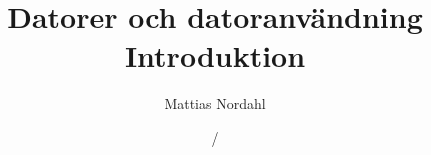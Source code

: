 \documentclass[handout]{beamer}
\author[]{Mattias Nordahl}
\institute{\url{mattias.nordahl@cs.lth.se}}
\date{}
\begin{document}
 

\title{Datorer och datoranvändning\\Introduktion} 

\frame[plain]{
\maketitle

\vspace{-2\baselineskip}
}

\date{\the\year/\the\numexpr{}} 


\end{document}
